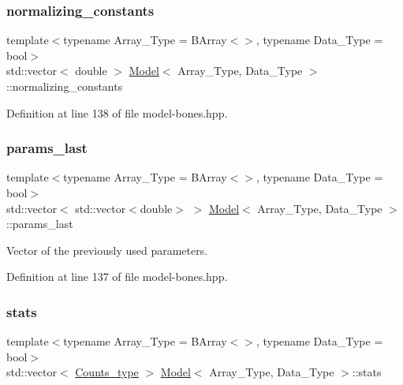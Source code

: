\subsubsection{\texorpdfstring{normalizing\+\_\+constants}{normalizing\_constants}}
{\footnotesize\ttfamily template$<$typename Array\+\_\+\+Type  = B\+Array$<$$>$, typename Data\+\_\+\+Type  = bool$>$ \\
std\+::vector$<$ double $>$ \hyperlink{class_model}{Model}$<$ Array\+\_\+\+Type, Data\+\_\+\+Type $>$\+::normalizing\+\_\+constants}



Definition at line 138 of file model-\/bones.\+hpp.

\mbox{\label{class_model_a627aaec1fe2c0e25546f68da78b0c00b}} 
\subsubsection{\texorpdfstring{params\+\_\+last}{params\_last}}
{\footnotesize\ttfamily template$<$typename Array\+\_\+\+Type  = B\+Array$<$$>$, typename Data\+\_\+\+Type  = bool$>$ \\
std\+::vector$<$ std\+::vector$<$double$>$ $>$ \hyperlink{class_model}{Model}$<$ Array\+\_\+\+Type, Data\+\_\+\+Type $>$\+::params\+\_\+last}



Vector of the previously used parameters. 



Definition at line 137 of file model-\/bones.\+hpp.

\mbox{\label{class_model_a1816b0dd69226394643dc31916c8645e}} 
\subsubsection{\texorpdfstring{stats}{stats}}
{\footnotesize\ttfamily template$<$typename Array\+\_\+\+Type  = B\+Array$<$$>$, typename Data\+\_\+\+Type  = bool$>$ \\
std\+::vector$<$ \hyperlink{typedefs_8hpp_aee40fa17c1fddb63dd1f2b1470ade95b}{Counts\+\_\+type} $>$ \hyperlink{class_model}{Model}$<$ Array\+\_\+\+Type, Data\+\_\+\+Type $>$\+::stats}



